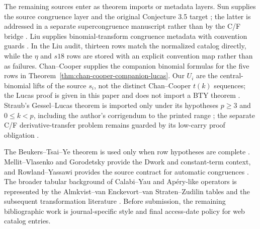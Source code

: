 \documentclass[11pt,a4paper]{article}
\begin{document}
The remaining sources enter as theorem imports or metadata layers.  Sun
supplies the source congruence layer and the original Conjecture 3.5 target
\cite{sun_2022_supercongruences}; the latter is addressed in a separate
supercongruence manuscript rather than by the C/F bridge
\cite{babanskyy_2026_sun35_bridge}.  Liu supplies binomial-transform
congruence metadata with convention guards \cite{liu_2025_binomial_transforms}.
In the Liu audit, thirteen rows match the normalized catalog directly, while
the $\eta$ and $s18$ rows are stored with an explicit convention map rather
than as failures.  Chan--Cooper supplies the companion binomial formulas for
the five rows in Theorem~\ref{thm:chan-cooper-companion-lucas}.  Our $U_i$
are the central-binomial lifts of the source $s_i$, not the distinct
Chan--Cooper $t(k)$ sequences; the Lucas proof
is given in this paper and does not import a BTY theorem
\cite{chan_cooper_2012_rational_analogues}.  Straub's
Gessel--Lucas theorem is imported only under its hypotheses $p\geq3$ and
$0\leq k<p$, including the author's corrigendum to the printed range
\cite{straub_gessel_lucas_corrigendum}; the separate C/F derivative-transfer
problem remains guarded by its low-carry proof obligation \cite{straub_2024_gessel_lucas}.

The Beukers--Tsai--Ye theorem is used only when row hypotheses are complete
\cite{beukers_tsai_ye_2025_lucas}.  Mellit--Vlasenko and Gorodetsky provide
the Dwork and constant-term context, and Rowland--Yassawi provides the source
contract for automatic congruences
\cite{mellit_vlasenko_2015_dwork,gorodetsky_2023_sporadic_representations,rowland_yassawi_2015_automatic_congruences}.
The broader tabular background of Calabi--Yau and Ap{\'e}ry-like operators is
represented by the Almkvist--van Enckevort--van Straten--Zudilin tables and
the subsequent transformation literature
\cite{almkvist_van_enckevort_van_straten_zudilin_2005_tables,
almkvist_van_straten_zudilin_2011_clausen}.  Before submission, the remaining
bibliographic work is journal-specific style and final access-date policy for
web catalog entries.



\end{document}
